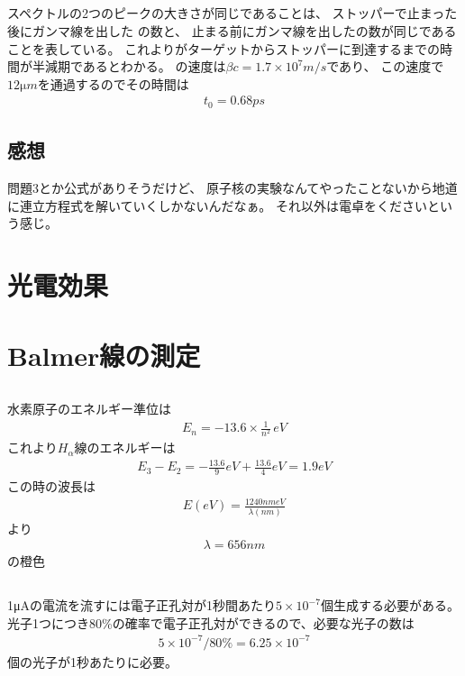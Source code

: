 \documentclass[../../master.tex]{subfiles}
\begin{document}
\subsection{}
スペクトルの2つのピークの大きさが同じであることは、
ストッパーで止まった後にガンマ線を出した の数と、
止まる前にガンマ線を出したの数が同じであることを表している。
これよりがターゲットからストッパーに到達するまでの時間が半減期であるとわかる。
の速度は\(\beta c = 1.7\times 10^7 \si{m/s}\)であり、
この速度で\(12\si{\micro m}\)を通過するのでその時間は
\begin{align}
    t_0 =  0.68\si{ps}
\end{align}

\subsection*{感想}
問題3とか公式がありそうだけど、
原子核の実験なんてやったことないから地道に連立方程式を解いていくしかないんだなぁ。
それ以外は電卓をくださいという感じ。

\clearpage
\section{光電効果}

\clearpage
\section{Balmer線の測定}
\subsection{}
水素原子のエネルギー準位は
\begin{align}
    E_n = -13.6\times\frac{1}{n^2} \,\si{eV}
\end{align}
これより\(H_\alpha\)線のエネルギーは
\begin{align}
    E_3 - E_2 = -\frac{13.6}{9} \si{eV} + \frac{13.6}{4} \si{eV} = 1.9 eV
\end{align}
この時の波長は
\begin{align}
    E \si{(eV)} = \frac{1240 \si{nm eV}}{\lambda \si{(nm)}}
\end{align}
より
\begin{align}
    \lambda = 656 \si{nm}
\end{align}
の橙色

\subsection{}
1\si{\micro A}の電流を流すには電子正孔対が1秒間あたり\(5\times 10^{-7}\)個生成する必要がある。
光子1つにつき80\%の確率で電子正孔対ができるので、必要な光子の数は
\begin{align}
    5\times10^{-7}/80\% = 6.25 \times 10^{-7}
\end{align}
個の光子が1秒あたりに必要。
\end{document}

